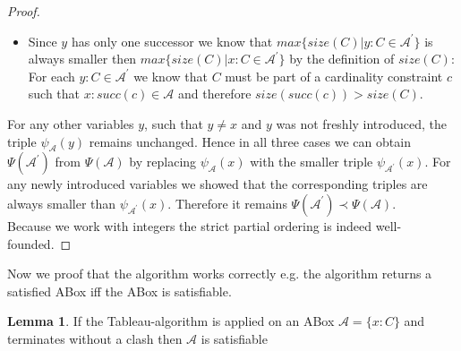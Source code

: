 \documentclass{book}
\theoremstyle{break}
\theoremstyle{definition}
\newtheorem{mylem}{Lemma}
\begin{document}
\begin{proof}
\begin{itemize}
\begin{itemize}
\item Since $y$ has only one successor we know that $max\{size(C)|y:C\in\mathcal{A}^\prime\}$ is always smaller then $max\{size(C)|x:C\in\mathcal{A}^\prime\}$ by the definition of $size(C)$: For each $y:C\in\mathcal{A}^\prime$ we know that $C$ must be part of a cardinality constraint $c$ such that $x:succ(c)\in\mathcal{A}$ and therefore $size(succ(c))>size(C)$.
\end{itemize} 
\end{itemize}
For any other variables $y$, such that $y\neq x$ and $y$ was not freshly introduced, the triple $\psi_\mathcal{A}(y)$ remains unchanged. Hence in all three cases we can obtain $\Psi(\mathcal{A}^\prime)$ from $\Psi(\mathcal{A})$ by replacing $\psi_\mathcal{A}(x)$ with the smaller triple $\psi_{\mathcal{A}^\prime}(x)$. For any newly introduced variables we showed that the corresponding triples are always smaller than $\psi_{\mathcal{A}^\prime}(x)$. Therefore it remains $\Psi(\mathcal{A}^\prime)\prec\Psi(\mathcal{A})$. \\
Because we work with integers the strict partial ordering is indeed well-founded.
\end{proof}
Now we proof that the algorithm works correctly e.g. the algorithm returns a satisfied ABox iff the ABox is satisfiable.
\begin{mylem}
If the Tableau-algorithm is applied on an ABox $\mathcal{A}=\{x:C\}$ and  terminates without a clash then $\mathcal{A}$ is satisfiable
\end{mylem}
\end{document}
